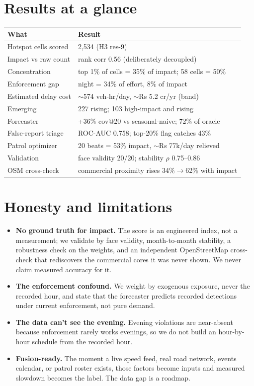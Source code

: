 \documentclass[11pt,a4paper]{article}
\begin{document}
\section{Results at a glance}
\begin{table}[h]\centering\small
\begin{tabular}{ll}
\toprule
\textbf{What} & \textbf{Result} \\
\midrule
Hotspot cells scored & 2{,}534 (H3 res-9) \\
Impact vs raw count & rank corr 0.56 (deliberately decoupled) \\
Concentration & top 1\% of cells = 35\% of impact; 58 cells = 50\% \\
Enforcement gap & night = 34\% of effort, 8\% of impact \\
Estimated delay cost & $\sim$574 veh-hr/day, $\sim$Rs 5.2 cr/yr (band) \\
Emerging & 227 rising; 103 high-impact and rising \\
Forecaster & +36\% cov@20 vs seasonal-naive; 72\% of oracle \\
False-report triage & ROC-AUC 0.758; top-20\% flag catches 43\% \\
Patrol optimizer & 20 beats = 53\% impact, $\sim$Rs 77k/day relieved \\
Validation & face validity 20/20; stability $\rho$ 0.75--0.86 \\
OSM cross-check & commercial proximity rises 34\%$\to$62\% with impact \\
\bottomrule
\end{tabular}
\end{table}

\section{Honesty and limitations}
\begin{itemize}[label=\textbullet]
  \item \textbf{No ground truth for impact.} The score is an engineered index, not a measurement; we validate by face validity, month-to-month stability, a robustness check on the weights, and an independent OpenStreetMap cross-check that rediscovers the commercial cores it was never shown. We never claim measured accuracy for it.
  \item \textbf{The enforcement confound.} We weight by exogenous exposure, never the recorded hour, and state that the forecaster predicts recorded detections under current enforcement, not pure demand.
  \item \textbf{The data can't see the evening.} Evening violations are near-absent because enforcement rarely works evenings, so we do not build an hour-by-hour schedule from the recorded hour.
  \item \textbf{Fusion-ready.} The moment a live speed feed, real road network, events calendar, or patrol roster exists, those factors become inputs and measured slowdown becomes the label. The data gap is a roadmap.
\end{itemize}
\end{document}
